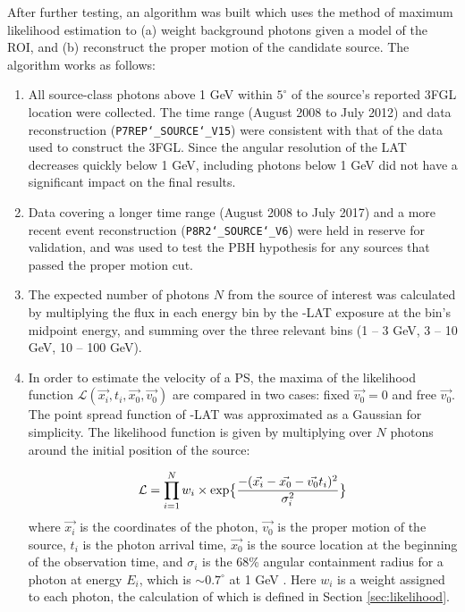 After further testing, an algorithm was built which uses the method of maximum likelihood estimation to (a) weight background photons given a model of the ROI, and (b) reconstruct the proper motion of the candidate source.
The algorithm works as follows:
\begin{enumerate}
\item
All source-class photons above 1 GeV within $5^\circ$ of the source's reported 3FGL location were collected.
The time range (August 2008 to July 2012) and data reconstruction (\texttt{P7REP\char`_SOURCE\char`_V15}) were consistent with that of the data used to construct the 3FGL.
Since the angular resolution of the \Fermi LAT decreases quickly below 1 GeV, including photons below 1 GeV did not have a significant impact on the final results.
\item 
Data covering a longer time range (August 2008 to July 2017) and a more recent event reconstruction (\texttt{P8R2\char`_SOURCE\char`_V6}) were held in reserve for validation, and was used to test the PBH hypothesis for any sources that passed the proper motion cut.

\item
The expected number of photons $N$ from the source of interest was calculated by multiplying the flux in each energy bin by 
the \Fermi-LAT exposure at the bin's midpoint energy, and summing over the three relevant bins (1 -- 3 GeV, 3 -- 10 GeV, 10 -- 100 GeV). 
\item 
\label{step:prop_motion_likelihood}
In order to estimate the velocity of a PS, the maxima of the likelihood function $\mathcal{L}(\vec{x_i},t_i,\vec{x_0},\vec{v_0})$ are compared in two cases: 
fixed $\vec{v_0}=0$ and free $\vec{v_0}$. 
The point spread function of \Fermi-LAT was approximated as a Gaussian for simplicity.
The likelihood function is given by multiplying over $N$ photons around the initial position of the source:

\noindent
\begin{equation}
\label{eq:vlike}
\mathcal{L} = \prod_{i=1}^{N}w_i\times \textup{exp} \big\{\frac{{-(\vec{x_i}-\vec{x_0}-\vec{v_0}t_i)^2}}{{\sigma_i^2}}\big\}
\end{equation}
where $\vec{x_i}$ is the coordinates of the photon, $\vec{v_0}$ is the proper motion of the source, $t_i$ is the photon arrival time, $\vec{x_0}$ is the source location at the beginning of the observation time, and $\sigma_i$ is the 68\% angular containment radius for a photon at energy $E_i$, which is $\sim 0.7^\circ$ at 1 GeV \citep{2013arXiv1304.5456B}.
Here $w_i$ is a weight assigned to each photon, the calculation of which is defined in Section \ref{sec:likelihood}. 


\end{enumerate}
